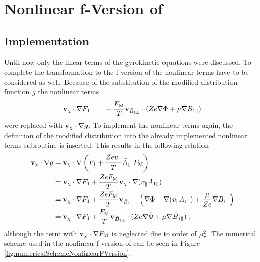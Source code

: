 \section{Nonlinear f-Version of {\gkw}}
\label{sec:simNonlinearFVersion}

\subsection{Implementation}
\label{sub:implementationNonlinearFVersion}

Until now only the linear terms of the gyrokinetic equations were discussed. To complete the transformation to the f-version of {\gkw} the nonlinear terms have to be considered as well. Because of the substitution of the modified distribution function $g$ the nonlinear terms 
\begin{gather*}
    \boldsymbol{\mathbf{v}}_\chi \cdot \nabla F_1 \qquad -\frac{F_\mathrm{M}}{T} \boldsymbol{\mathbf{v}}_{\bar{B}_{1\perp}} \cdot (Z e \nabla \bar{\Phi} + \mu \nabla \bar{B}_{1\parallel})
    \label{eq:nonlinearTermsFVersion}
\end{gather*}
were replaced with $\boldsymbol{\mathbf{v}}_\chi \cdot \nabla g$. To implement the nonlinear terms again, the definition of the modified distribution into the already implemented nonlinear terms subroutine is inserted. This results in the following relation
\begin{gather}
    \begin{aligned}
        \boldsymbol{\mathbf{v}}_\chi \cdot \nabla g &= \boldsymbol{\mathbf{v}}_\chi \cdot \nabla \left(F_1 + \frac{Ze v_\parallel}{T} \bar{A}_{1\parallel} F_\mathrm{M}\right) \\
                             &= \boldsymbol{\mathbf{v}}_\chi \cdot \nabla F_1 + \frac{Ze F_\mathrm{M}}{T} \boldsymbol{\mathbf{v}}_\chi \cdot \nabla (v_\parallel\bar{A}_{1\parallel}) \\
                             &= \boldsymbol{\mathbf{v}}_\chi \cdot \nabla F_1 + \frac{Ze F_\mathrm{M}}{T} \boldsymbol{\mathbf{v}}_{\bar{B}_{1\perp}} \cdot \left( \nabla \bar{\Phi} - \nabla (v_\parallel \bar{A}_{1\parallel}) + \frac{\mu}{Ze} \nabla \bar{B}_{1\parallel} \right) \\
                             &= \boldsymbol{\mathbf{v}}_\chi \cdot \nabla F_1 + \frac{F_\mathrm{M}}{T} \boldsymbol{\mathbf{v}}_{\bar{B}_{1\perp}} \cdot ( Ze \nabla \bar{\Phi} + \mu \nabla \bar{B}_{1\parallel}) ~,
    \end{aligned}
    \label{eq:nonlinearTermsGVersionToFVersion}
\end{gather}
although the term with $\boldsymbol{\mathbf{v}}_\chi \cdot \nabla F_\mathrm{M}$ is neglected due to order of $\rho_\star^2$. The numerical scheme used in the nonlinear f-version of {\gkw} can be seen in Figure \ref{fig:numericalSchemeNonlinearFVersion}. 

\newpage

